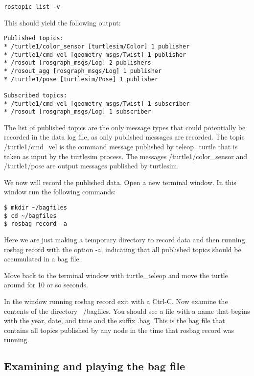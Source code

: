 \begin{lstlisting}[breaklines=true languages=bash]
rostopic list -v
\end{lstlisting}

This should yield the following output:

\begin{lstlisting}[breaklines=true languages=bash]
Published topics:
* /turtle1/color_sensor [turtlesim/Color] 1 publisher
* /turtle1/cmd_vel [geometry_msgs/Twist] 1 publisher
* /rosout [rosgraph_msgs/Log] 2 publishers
* /rosout_agg [rosgraph_msgs/Log] 1 publisher
* /turtle1/pose [turtlesim/Pose] 1 publisher

Subscribed topics:
* /turtle1/cmd_vel [geometry_msgs/Twist] 1 subscriber
* /rosout [rosgraph_msgs/Log] 1 subscriber
\end{lstlisting}

The list of published topics are the only message types that could potentially be recorded in the data log file, as only published messages are recorded. The topic /turtle1/cmd\_vel is the command message published by teleop\_turtle that is taken as input by the turtlesim process. The messages /turtle1/color\_sensor and /turtle1/pose are output messages published by turtlesim.

We now will record the published data. Open a new terminal window. In this window run the following commands:

\begin{lstlisting}[breaklines=true languages=bash]
$ mkdir ~/bagfiles
$ cd ~/bagfiles
$ rosbag record -a
\end{lstlisting}

Here we are just making a temporary directory to record data and then running rosbag record with the option -a, indicating that all published topics should be accumulated in a bag file.

Move back to the terminal window with turtle\_teleop and move the turtle around for 10 or so seconds.

In the window running rosbag record exit with a Ctrl-C. Now examine the contents of the directory ~/bagfiles. You should see a file with a name that begins with the year, date, and time and the suffix .bag. This is the bag file that contains all topics published by any node in the time that rosbag record was running.

\subsection{Examining and playing the bag file}

